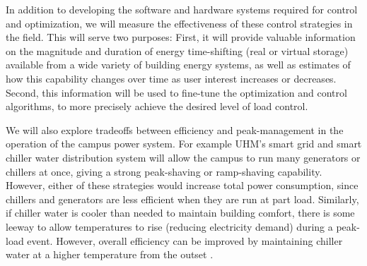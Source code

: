 In addition to developing the software and hardware systems required 
for control and optimization, we will measure the effectiveness of these 
control strategies in the field. This will serve two purposes: 
First, it will provide valuable
information on the magnitude and duration of energy time-shifting 
(real or virtual storage) available 
from a wide variety of building energy systems, as well as estimates of how
this capability changes over time as user interest increases or decreases. 
Second, this information will be used to fine-tune the
optimization and control algorithms, to more precisely achieve the desired
level of load control.

We will also explore tradeoffs between efficiency and peak-management in the operation
of the campus power system. For example UHM's
smart grid and smart chiller water distribution system will allow the campus to
run many generators or chillers at once, giving a strong peak-shaving or
ramp-shaving capability. However, either of these strategies would increase
total power consumption, since chillers and generators are less efficient
when they are run at part load. Similarly, if chiller water is cooler than needed
to maintain building comfort, there is some leeway to allow temperatures to rise
(reducing electricity demand) during a peak-load event. However, overall 
efficiency can be improved by maintaining chiller water at a higher temperature
from the outset \cite{Motegi07}.

